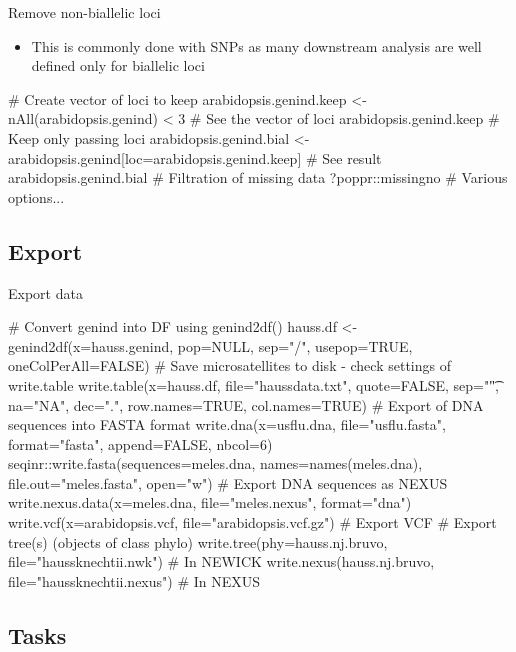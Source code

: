 \documentclass[compress, ucs, xelatex, 11pt, xcolor=svgnames, aspectratio=169,
	hyperref={
		bookmarks=true,
		unicode=true,
		colorlinks=true,
		pdftitle={Molecular data in R},
		plainpages=false,
		pdfauthor={Vojtech Zeisek},
		pdfsubject={Course about phylogeny and evolution in R},
		pdfcreator={XeLaTeX},
		pdfkeywords={R, evolution, phylogeny, molecular data},
		linkcolor=Crimson, %
		anchorcolor=Magenta, %
		citecolor=Magenta, %
		filecolor=Magenta, %
		menucolor=Magenta, %
		urlcolor=DodgerBlue, %
		pdftex},
	url={hyphens, lowtilde} %
	]{beamer}
\begin{document}
\begin{frame}[fragile]{Remove non-biallelic loci}
	\begin{itemize}
		\item This is commonly done with SNPs as many downstream analysis are well defined only for biallelic loci
	\end{itemize}
	\begin{spluscode}
    # Create vector of loci to keep
    arabidopsis.genind.keep <- nAll(arabidopsis.genind) < 3
    # See the vector of loci
    arabidopsis.genind.keep
    # Keep only passing loci
    arabidopsis.genind.bial <-
      arabidopsis.genind[loc=arabidopsis.genind.keep]
    # See result
    arabidopsis.genind.bial
    # Filtration of missing data
    ?poppr::missingno # Various options...
	\end{spluscode}
\end{frame}

\subsection{Export}

\begin{frame}[fragile]{Export data}
	\begin{spluscode}
    # Convert genind into DF using genind2df()
    hauss.df <- genind2df(x=hauss.genind, pop=NULL, sep="/",
      usepop=TRUE, oneColPerAll=FALSE)
    # Save microsatellites to disk - check settings of write.table
    write.table(x=hauss.df, file="haussdata.txt", quote=FALSE,
      sep="\t", na="NA", dec=".", row.names=TRUE, col.names=TRUE)
    # Export of DNA sequences into FASTA format
    write.dna(x=usflu.dna, file="usflu.fasta", format="fasta",
      append=FALSE, nbcol=6)
    seqinr::write.fasta(sequences=meles.dna, names=names(meles.dna),
      file.out="meles.fasta", open="w")
    # Export DNA sequences as NEXUS
    write.nexus.data(x=meles.dna, file="meles.nexus", format="dna")
    write.vcf(x=arabidopsis.vcf, file="arabidopsis.vcf.gz") # Export VCF
    # Export tree(s) (objects of class phylo)
    write.tree(phy=hauss.nj.bruvo, file="haussknechtii.nwk") # In NEWICK
    write.nexus(hauss.nj.bruvo, file="haussknechtii.nexus") # In NEXUS
	\end{spluscode}
\end{frame}

\subsection{Tasks}
\end{document}
